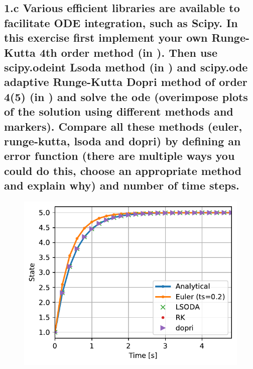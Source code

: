 \documentclass{cmc}
\begin{document}



\clearpage

\subsection*{1.c Various efficient libraries are available to facilitate ODE
  integration, such as Scipy. In this exercise first implement your own Runge-Kutta 4th order
  method (in ). %
  Then use scipy.odeint Lsoda method (in ) %
  and scipy.ode adaptive Runge-Kutta Dopri method of order 4(5) (in ) %
  and solve the ode (overimpose plots of the solution using different methods and markers).
  Compare all these methods (euler, runge-kutta, lsoda and dopri) by defining an error
  function (there are multiple ways you could do this, choose an appropriate method
  and explain why) and number of time steps.
  }




\begin{figure}[H]
  \centering
  \includegraphics[height=0.4\textheight]{figures/Integration_methods}
  \caption{}
\end{figure}
\end{document}
